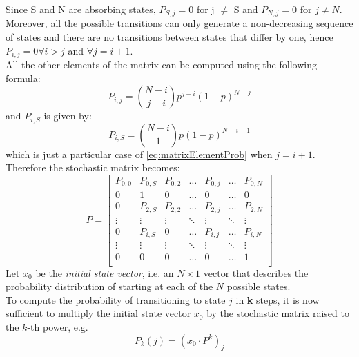 Since S and N are absorbing states, $P_{S,j}=0$ for j $\neq$ S and $P_{N,j} = 0$
for $j \neq N$.\\
Moreover, all the possible transitions can only generate a non-decreasing
sequence of states and there are no transitions between states that differ by
one, hence $P_{i, j} = 0 \forall i > j$ and $\forall j = i + 1$.\\
All the other elements of the matrix can be computed using the following formula:
\begin{equation}
    P_{i,j} = {N-i\choose j - i} p^{j - i} (1-p)^{N - j}
    \label{eq:matrixElementProb}
\end{equation}
and $P_{i,S}$ is given by:
\begin{equation}
    P_{i,S} = {N-i\choose 1} p(1-p)^{N - i - 1}
    \label{eq:matrixProbToS}
\end{equation}
which is just a particular case of \eqref{eq:matrixElementProb} when $j = i + 1$.\\
Therefore the stochastic matrix becomes:
\begin{equation*}
P = 
\begin{bmatrix}
P_{0,0}	& P_{0,S}	& P_{0,2}	& \dots  	& P_{0,j}	& \dots		& P_{0,N} \\
0		& 1			& 0			& \dots  	& 0			& \dots		& 0		 \\
0		& P_{2,S}	& P_{2,2}	& \dots  	& P_{2,j}	& \dots		& P_{2,N} \\
\vdots	& \vdots	& \vdots	& \ddots 	& \vdots	& \ddots	& \vdots \\
0		& P_{i,S}	& 0			& \dots		& P_{i,j}	& \dots		& P_{i,N} \\
\vdots	& \vdots	& \vdots	& \ddots	& \vdots	& \ddots	& \vdots \\
0		& 0			& 0			& \dots  	& 0			& \dots		& 1		 \\
\end{bmatrix}
\label{stochasticMatrix2}
\end{equation*}
Let $x_{0}$ be the \textit{initial state vector}, i.e. an $N \times 1$ vector
that describes the probability distribution of starting at each of the $N$
possible states.\\
To compute the probability of transitioning to state $j$ in \textbf{k} steps, it
is now sufficient to multiply the initial state vector $x_{0}$ by the stochastic
matrix raised to the $k$-th power, e.g.
\begin{equation}\label{probAtStateK1}
P_{k}(j) = (x_{0}\cdot P^{k})_{j}
\end{equation}
